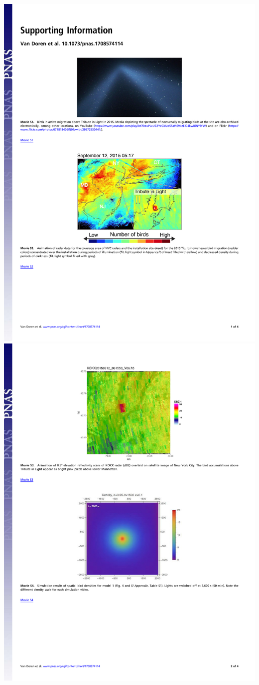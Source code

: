 \documentclass[a4paper, twoside]{templates/ociamthesis}
\begin{document}
\includegraphics[width=1\linewidth]{pdf_chapters/lights/lights_supp_crop_Part01}
\includegraphics[width=1\linewidth]{pdf_chapters/lights/lights_supp_crop_Part02}
\end{document}
